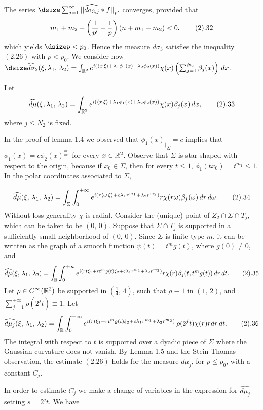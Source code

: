 The series $\dsize
\sum_{j=1}^{\infty}{||{\widehat{d\sigma_{3,j}}*f}||}_{p'}$ 
converges, provided that 
$$m_1+ m_2 +
\left(\frac{1}{p'}-\frac{1}{p}\right) (n+m_1+ m_2)<0,\tag 2.32
$$
which  yields
$\dsize p<p_0$. Hence the measure $d\sigma_3$ satisfies 
the inequality $(2.26)$ with $p < p_0$.  
\bigskip
We consider now   $\dsize
\widehat{d\sigma}_2(\xi,\lambda_1,\,\lambda_2) =\int_{{\Bbb R}^2} 
e^{i(\langle x\,\xi\rangle+\lambda_1\phi_1(x)+\lambda_2\phi_2(x))}
\chi(x) \left(\sum_{j=1}^{N_2}
\beta_j(x)\right) \,dx $.
\par
Let    
$$\widehat{d\mu}(\xi,\lambda_1,\,\lambda_2) =
\int_{{\Bbb R}^2} 
e^{i(\langle x\,\xi\rangle+\lambda_1\phi_1(x)+\lambda_2\phi_2(x))}
\chi(x)\beta_j(x) \,dx,
\tag 2.33
$$ 
where   $j\leq N_2$ is fixed.
\par
In the proof of lemma 1.4 we observed that  
${{\phi_1(x)}_{|}}_{\Sigma} = c $  implies that
$\phi_1(x)=c\phi_2(x)^{\frac{m_1}{m_2}}$ for every $x\in {\Bbb R}^2$.
Observe that $\Sigma$ is star-shaped with respect to the origin, because 
if $x_0\in \Sigma$, then for every $t\leq1$, $\phi_1(tx_0)=t^{m_1}\leq 1$. 
In the polar coordinates associated to $\Sigma$,

$$
\widehat{d\mu}(\xi,\,\lambda_1,\,\lambda_2) =
\int_{\Sigma}\int_0^{+\infty}
e^{i(r\langle \omega\,\xi\rangle+c\lambda_1 r^{m_1}   +\lambda_2 r^{m_2}  )}
r\chi(r\omega)\beta_j(\omega)\,dr\,d\omega.
\tag 2.34
$$
Without loss generality  $\chi$ is radial. Consider 
the (unique) point of 
$Z_2\cap \Sigma\cap T_j$, which can be taken to be $(0,\,0)$. Suppose that 
$\Sigma\cap T_j$ is supported in a sufficiently small neighborhood  of  
$(0,\,0)$.  Since $\Sigma$ is finite type $m$, it 
can be   written  as the graph of a smooth 
function $\psi(t)=t^mg(t)$, where $g(0) \ne 0$, and 
$$
\widehat{d\mu} (\xi,\,\lambda_1,\,\lambda_2) =
\int_{{\Bbb R}}\int_0^{+\infty}
e^{i(rt\xi_1 + rt^mg(t) \xi_2 +c\lambda_1 r^{m_1}  +\lambda_2 r^{m_2})}
r\chi(r)\beta_j(t,t^mg(t))\,dr\,dt.
\tag 2.35
$$
Let $\rho\in C^{\infty}({\Bbb R}^2)$ be supported in 
$(\frac{1}{4},\, 4)$, such that   $\rho \equiv 1$ in $(1,\,2)$, and   
$\sum_{j=1}^{+\infty}\rho(2^jt)\equiv 1$.  Let 
$$
\widehat{d\mu_j }(\xi,\,\lambda_1,\,\lambda_2)  =
\int_{{\Bbb R}}\int_0^{+\infty}
e^{i(rt\xi_1 + rt^mg(t)\xi_2 +c\lambda_1 r^{m_1}  +\lambda_2 r^{m_2})}
 \,\rho(2^jt)\chi(r)rdr\,dt.\tag 2.36
$$ 
The integral with respect to $t$  is supported over a 
dyadic piece of $\Sigma$ where the  Gaussian curvature does not vanish. 
By Lemma 1.5 and the Stein-Thomas observation, the estimate $(2.26)$
holds for the measure $d\mu_j$, for $p\leq p_0$, with a constant $C_j$.
\par
In order to estimate $C_j$   we make a change of variables  in the expression
for $\widehat{ d\mu_j}$  setting $s=2^jt$. We have

